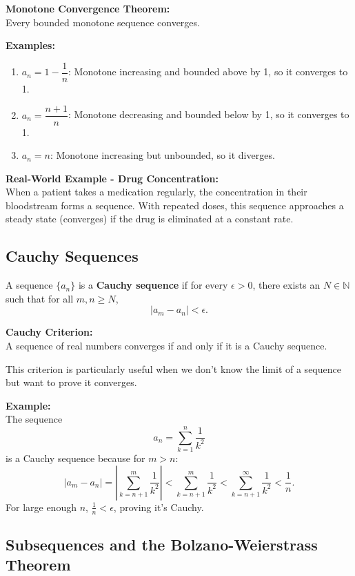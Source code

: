 \documentclass{article}
\begin{document}
\textbf{Monotone Convergence Theorem:} \\
Every bounded monotone sequence converges.

\textbf{Examples:}
\begin{enumerate}[label=\textbf{\arabic*.}]
    \item $a_n = 1 - \dfrac{1}{n}$: Monotone increasing and bounded above by 1, so it converges to 1.
    \item $a_n = \dfrac{n+1}{n}$: Monotone decreasing and bounded below by 1, so it converges to 1.
    \item $a_n = n$: Monotone increasing but unbounded, so it diverges.
\end{enumerate}

\textbf{Real-World Example - Drug Concentration:} \\
When a patient takes a medication regularly, the concentration in their bloodstream forms a sequence. With repeated doses, this sequence approaches a steady state (converges) if the drug is eliminated at a constant rate.

\subsection{Cauchy Sequences} \label{cauchy-sequences}

A sequence $\{a_n\}$ is a \textbf{Cauchy sequence} if for every $\epsilon > 0$, there exists an $N \in \mathbb{N}$ such that for all $m, n \geq N$, 
\[
|a_m - a_n| < \epsilon.
\]

\textbf{Cauchy Criterion:} \\
A sequence of real numbers converges if and only if it is a Cauchy sequence.

This criterion is particularly useful when we don't know the limit of a sequence but want to prove it converges.

\textbf{Example:} \\
The sequence 
\[
a_n = \sum_{k=1}^{n} \frac{1}{k^2}
\]
is a Cauchy sequence because for $m > n$:
\[
|a_m - a_n| = \left|\sum_{k=n+1}^{m} \frac{1}{k^2}\right| < \sum_{k=n+1}^{m} \frac{1}{k^2} < \sum_{k=n+1}^{\infty} \frac{1}{k^2} < \frac{1}{n}.
\]
For large enough $n$, $\frac{1}{n} < \epsilon$, proving it's Cauchy.

\subsection{Subsequences and the Bolzano-Weierstrass Theorem} \label{subsequences}
\end{document}
